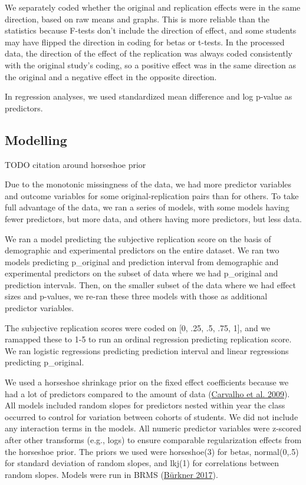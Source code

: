 \documentclass[
  english,
  a4paper,
]{article}
\begin{document}
We separately coded whether the original and replication effects were in the same direction, based on raw means and graphs. This is more reliable than the statistics because F-tests don't include the direction of effect, and some students may have flipped the direction in coding for betas or t-tests. In the processed data, the direction of the effect of the replication was always coded consistently with the original study's coding, so a positive effect was in the same direction as the original and a negative effect in the opposite direction.

In regression analyses, we used standardized mean difference and log p-value as predictors.

\hypertarget{modelling}{%
\subsection{Modelling}\label{modelling}}

TODO citation around horseshoe prior

Due to the monotonic missingness of the data, we had more predictor variables and outcome variables for some original-replication pairs than for others. To take full advantage of the data, we ran a series of models, with some models having fewer predictors, but more data, and others having more predictors, but less data.

We ran a model predicting the subjective replication score on the basis of demographic and experimental predictors on the entire dataset. We ran two models predicting p\_original and prediction interval from demographic and experimental predictors on the subset of data where we had p\_original and prediction intervals. Then, on the smaller subset of the data where we had effect sizes and p-values, we re-ran these three models with those as additional predictor variables.

The subjective replication scores were coded on {[}0, .25, .5, .75, 1{]}, and we ramapped these to 1-5 to run an ordinal regression predicting replication score. We ran logistic regressions predicting prediction interval and linear regressions predicting p\_original.

We used a horseshoe shrinkage prior on the fixed effect coefficients because we had a lot of predictors compared to the amount of data (\protect\hyperlink{ref-carvalho09}{Carvalho et al. 2009}). All models included random slopes for predictors nested within year the class occurred to control for variation between cohorts of students. We did not include any interaction terms in the models. All numeric predictor variables were z-scored after other transforms (e.g., logs) to ensure comparable regularization effects from the horseshoe prior. The priors we used were horseshoe(3) for betas, normal(0,.5) for standard deviation of random slopes, and lkj(1) for correlations between random slopes. Models were run in BRMS (\protect\hyperlink{ref-brms}{Bürkner 2017}).
\end{document}
